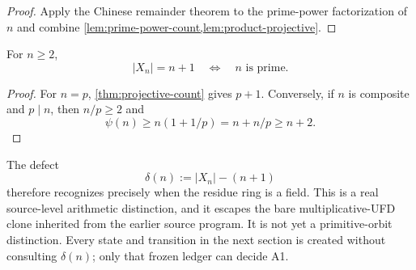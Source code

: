 \begin{proof}
Apply the Chinese remainder theorem to the prime-power factorization of $n$
and combine \cref{lem:prime-power-count,lem:product-projective}.
\end{proof}

\begin{corollary}
\label{cor:static-field}
For $n\ge2$,
\[
 |X_n|=n+1\quad\Longleftrightarrow\quad n\text{ is prime}.
\]
\end{corollary}

\begin{proof}
For $n=p$, \cref{thm:projective-count} gives $p+1$.  Conversely, if $n$ is
composite and $p\mid n$, then $n/p\ge2$ and
\[
 \psi(n)\ge n(1+1/p)=n+n/p\ge n+2.
\]
\end{proof}

The defect
\[
 \delta(n):=|X_n|-(n+1)
\]
therefore recognizes precisely when the residue ring is a field.  This is a
real source-level arithmetic distinction, and it escapes the bare
multiplicative-UFD clone inherited from the earlier source program.  It is
not yet a primitive-orbit distinction.  Every state and transition in the
next section is created without consulting $\delta(n)$; only that frozen
ledger can decide A1.
